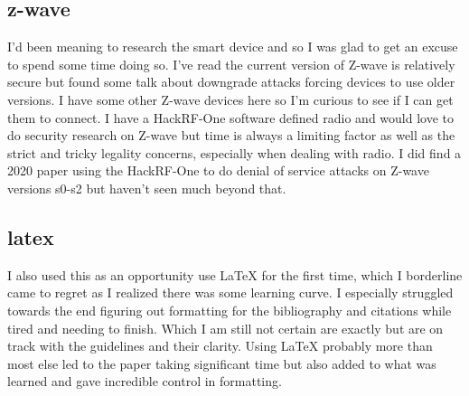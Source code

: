 \documentclass[10pt]{article}
\begin{document}
\subsection*{z-wave}
I'd been meaning to research the smart device and so I was glad to get an excuse to spend some time doing so. I've read the current version of Z-wave is 
relatively secure but found some talk about downgrade attacks forcing devices to use older versions. I have some other Z-wave devices here so I'm curious
to see if I can get them to connect. I have a HackRF-One software defined radio and would love to do security research on Z-wave but time is always a limiting 
factor as well as the strict and tricky legality concerns, especially when dealing with radio. I did find a 2020 paper using the HackRF-One to do denial of service
attacks on Z-wave versions s0-s2 but haven't seen much beyond that.

\subsection*{latex}
I also used this as an opportunity use LaTeX for the first time, which I borderline came to regret as I realized there was some learning curve. I especially 
struggled towards the end figuring out formatting for the bibliography and citations while tired and needing to finish. Which I am still not certain are exactly
but are on track with the guidelines and their clarity. Using LaTeX probably more than most else led to the paper taking significant time but also added to what 
was learned and gave incredible control in formatting.
\end{document}
